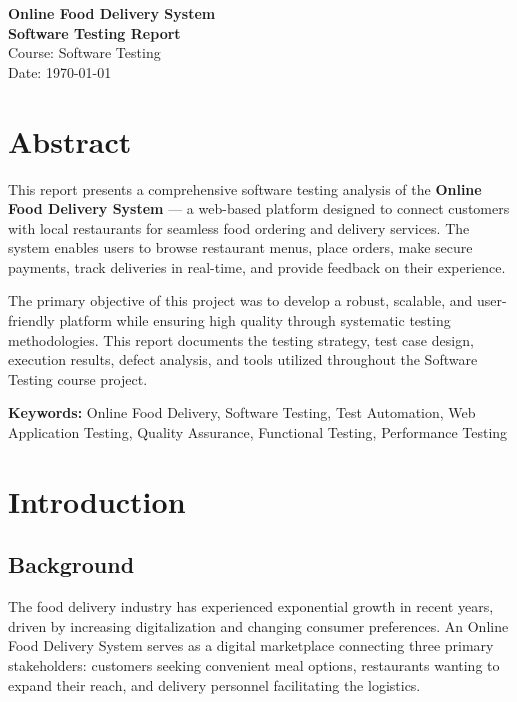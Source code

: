 \documentclass[12pt,a4paper]{report}
\begin{document}
\begin{titlepage}
\centering
\vspace*{2cm}
{\Huge\bfseries Online Food Delivery System}\\[0.5cm]
{\LARGE\bfseries Software Testing Report}\\[2cm]
\vfill
{\large Course: Software Testing}\\[0.5cm]
{\large Date: \today}\\[2cm]
\vfill
\end{titlepage}

\chapter*{Abstract}

This report presents a comprehensive software testing analysis of the \textbf{Online Food Delivery System} --- a web-based platform designed to connect customers with local restaurants for seamless food ordering and delivery services. The system enables users to browse restaurant menus, place orders, make secure payments, track deliveries in real-time, and provide feedback on their experience.

The primary objective of this project was to develop a robust, scalable, and user-friendly platform while ensuring high quality through systematic testing methodologies. This report documents the testing strategy, test case design, execution results, defect analysis, and tools utilized throughout the Software Testing course project.

\textbf{Keywords:} Online Food Delivery, Software Testing, Test Automation, Web Application Testing, Quality Assurance, Functional Testing, Performance Testing

\tableofcontents
\newpage

\chapter{Introduction}

\section{Background}
The food delivery industry has experienced exponential growth in recent years, driven by increasing digitalization and changing consumer preferences. An Online Food Delivery System serves as a digital marketplace connecting three primary stakeholders: customers seeking convenient meal options, restaurants wanting to expand their reach, and delivery personnel facilitating the logistics.
\end{document}
